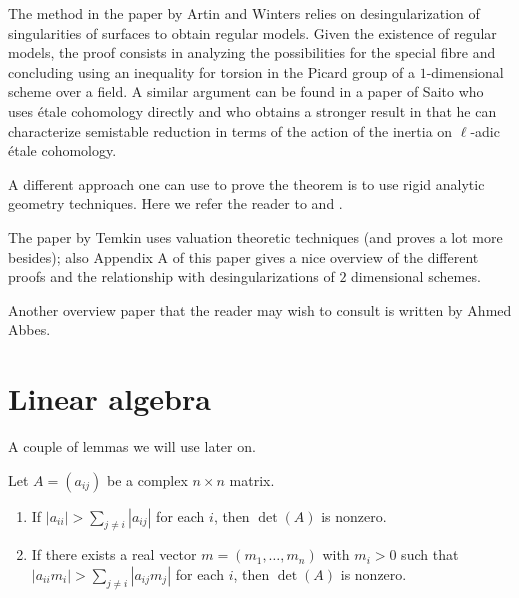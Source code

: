 \medskip\noindent
The method in the paper by Artin and Winters relies on desingularization
of singularities of surfaces to obtain regular models. Given the existence
of regular models, the proof consists in analyzing the
possibilities for the special fibre and concluding using an inequality
for torsion in the Picard group of a $1$-dimensional scheme over a field.
A similar argument can be found in a paper \cite{Saito} of Saito who uses
\'etale cohomology directly and who obtains a stronger result in that
he can characterize semistable reduction in terms of the action of
the inertia on $\ell$-adic \'etale cohomology.

\medskip\noindent
A different approach one can use to prove the theorem is to use
rigid analytic geometry techniques. Here we refer the reader to
\cite{vanderPut} and \cite{Arzdorf-Wewers}.

\medskip\noindent
The paper \cite{Temkin} by Temkin uses valuation theoretic techniques
(and proves a lot more besides); also Appendix A of this paper gives
a nice overview of the different proofs and the relationship with
desingularizations of $2$ dimensional schemes.

\medskip\noindent
Another overview paper that the reader may wish to consult is
\cite{Abbes-ssr} written by Ahmed Abbes.






\section{Linear algebra}
\label{section-linear-algebra}

\noindent
A couple of lemmas we will use later on.

\begin{lemma}
\label{lemma-recurring}
\begin{reference}
\cite[Theorem I]{Taussky}
\end{reference}
Let $A = (a_{ij})$ be a complex $n \times n$ matrix.
\begin{enumerate}
\item If $|a_{ii}| > \sum_{j \not = i} |a_{ij}|$ for each $i$, then
$\det(A)$ is nonzero.
\item If there exists a real vector $m = (m_1, \ldots, m_n)$
with $m_i > 0$ such that $|a_{ii} m_i| > \sum_{j \not = i} |a_{ij}m_j|$
for each $i$, then $\det(A)$ is nonzero.
\end{enumerate}
\end{lemma}

